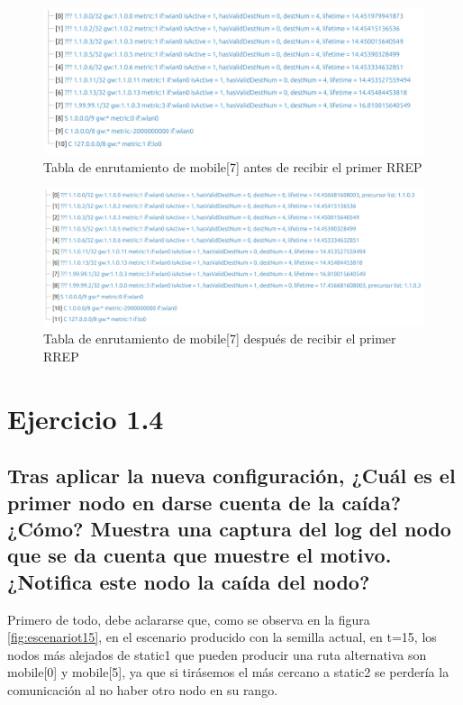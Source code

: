 \begin{figure}[H]
    \centering
    \includegraphics[width=125mm, scale=0.75]{imaxes/ejercicio3_1.png}
    \caption{Tabla de enrutamiento de mobile[7] antes de recibir el primer RREP}
    \label{fig:rtable_prev_mob7RREP}
\end{figure}

\begin{figure}[H]
    \centering
    \includegraphics[width=125mm, scale=0.75]{imaxes/ejercicio3_2.png}
    \caption{Tabla de enrutamiento de mobile[7] después de recibir el primer RREP}
    \label{fig:rtable_post_mob7RREP}
\end{figure}

\vspace{1.25cm}
\section{Ejercicio 1.4}

\subsection{Tras aplicar la nueva configuración, ¿Cuál es el primer nodo en darse cuenta de la caída? ¿Cómo? Muestra una captura del log del nodo que se da cuenta que muestre el motivo. ¿Notifica este nodo la caída del nodo?}

Primero de todo, debe aclararse que, como se observa en la figura \ref{fig:escenariot15}, en el escenario producido con la semilla actual, en t=15, los nodos más alejados de static1 que pueden producir una ruta alternativa son mobile[0] y mobile[5], ya que si tirásemos el más cercano a static2 se perdería la comunicación al no haber otro nodo en su rango.

